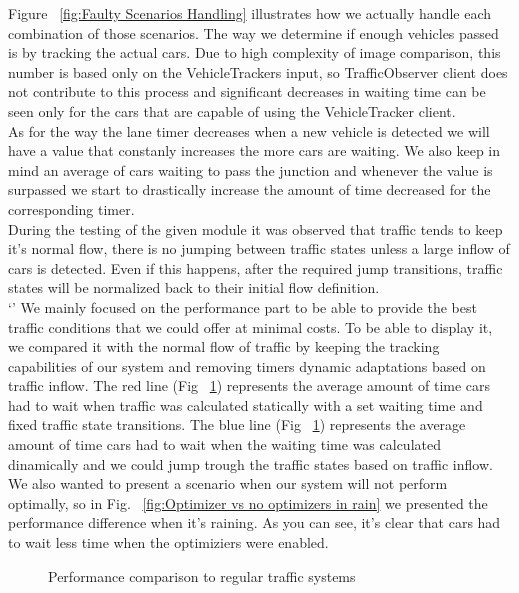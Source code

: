 \documentclass[17pt]{report}
\begin{document}
\indent
Figure ~\ref{fig:Faulty Scenarios Handling} illustrates how 
we actually handle each combination of those scenarios. The way we determine if enough vehicles passed is by 
tracking the actual cars. Due to high complexity of image 
comparison, this number is based only on the VehicleTrackers 
input, so TrafficObserver client does not contribute to this process 
and significant decreases in waiting time can be seen only for the 
cars that are capable of using the VehicleTracker client.\\
\indent
As for the way the lane timer decreases when a new vehicle is
detected we will have a value that constanly increases the more cars 
are waiting. We also keep in mind an average of cars 
waiting to pass the junction and whenever the value is surpassed 
we start to drastically increase the amount of time decreased 
for the corresponding timer.\\
\indent
During the testing of the given module it was observed that traffic tends to keep it's 
normal flow, there is no jumping between traffic states unless a large inflow of cars is 
detected. Even if this happens, after the required jump transitions, traffic states will 
be normalized back to their initial flow definition. \\
\indent`'
We mainly focused on the performance part to be able to provide
the best traffic conditions that we could offer at minimal costs.
To be able to display it, we compared it with the normal 
flow of traffic by keeping the tracking capabilities of our system 
and removing timers dynamic adaptations based on traffic inflow. 
The red line (Fig ~\ref{fig:Optimizer vs no optimizers}) represents the 
average amount of time cars had to wait when traffic was 
calculated statically with a set waiting time and fixed traffic state 
transitions. The blue line (Fig ~\ref{fig:Optimizer vs no optimizers}) 
represents the average amount of time cars had to wait when the 
waiting time was calculated dinamically and we could jump trough 
the traffic states based on traffic inflow. We also wanted to present a 
scenario when our system will not perform optimally, so in Fig. 
~\ref{fig:Optimizer vs no optimizers in rain} we presented 
the performance difference when it's raining. As you can see,
it's clear that cars had to wait less time when the optimiziers
were enabled. \\
\begin{figure}[h!]
    \centering
    \label{fig:Optimizer vs no optimizers}
    \caption{Performance comparison to regular traffic systems}
\end{figure}
\end{document}
